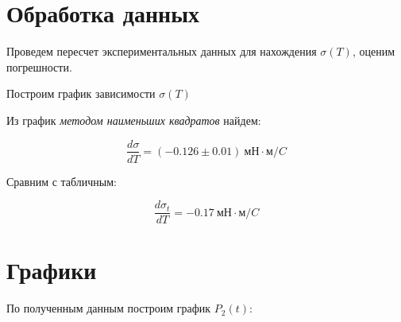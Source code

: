 \documentclass[a4paper,11.5pt]{article} %
\begin{document}
\bigskip

\section{Обработка данных}

\smallskip

Проведем пересчет экспериментальных данных для нахождения $\sigma(T)$, оценим погрешности.

\smallskip

Построим график зависимости $\sigma(T)$

\smallskip

Из график \textit{методом наименьших квадратов} найдем:

\smallskip

\begin{equation}
\frac{d\sigma}{dT} = (-0.126 \pm 0.01)\ \text{мН} \cdot \text{м} / C
\end{equation}

Сравним с табличным:

\begin{equation}
\frac{d\sigma_t}{dT} = -0.17\ \text{мН} \cdot \text{м} / C
\end{equation}

\bigskip

\section{Графики}

По полученным данным построим график $P_2(t)$:

\begin{figure}[h]
	\label{gr:1}
\end{figure}
\end{document}

